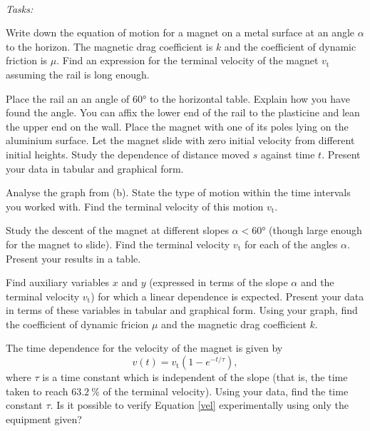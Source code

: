 \documentclass[../TST.tex]{subfiles}
\begin{document}
\begin{eproblem}{\ \\[5pt]}
\textit{Tasks:}
\begin{subpart}
\item Write down the equation of motion for a magnet on a metal surface at an angle $\alpha$ to the horizon. The magnetic drag coefficient is $k$ and the coefficient of dynamic friction is $\mu$. Find an expression for the terminal velocity of the magnet $v_\mathrm{t}$ assuming the rail is long enough.
\item Place the rail an an angle of $\ang{60}$ to the horizontal table. Explain how you have found the angle. You can affix the lower end of the rail to the plasticine and lean the upper end on the wall. Place the magnet with one of its poles lying on the aluminium surface. Let the magnet slide with zero initial velocity from different initial heights. Study the dependence of distance moved $s$ against time $t$. Present your data in tabular and graphical form.
\item Analyse the graph from (b). State the type of motion within the time intervals you worked with. Find the terminal velocity of this motion $v_\mathrm{t}$.
\item Study the descent of the magnet at different slopes $\alpha<\ang{60}$ (though large enough for the magnet to slide). Find the terminal velocity $v_\mathrm{t}$ for each of the angles $\alpha$. Present your results in a table.
\item Find auxiliary variables $x$ and $y$ (expressed in terms of the slope $\alpha$ and the terminal velocity $v_\mathrm{t}$) for which a linear dependence is expected. Present your data in terms of these variables in tabular and graphical form. Using your graph, find the coefficient of dynamic fricion $\mu$ and the magnetic drag coefficient $k$.
\item The time dependence for the velocity of the magnet is given by
	\begin{equation}
		v(t)=v_\mathrm{t}(1-e^{-t/\tau})
	,
	\label{vel}
	\end{equation}
	where $\tau$ is a time constant which is independent of the slope (that is, the time taken to reach $\qty{63.2}{\percent}$ of the terminal velocity). Using your data, find the time constant $\tau$. Is it possible to verify Equation \eqref{vel} experimentally using only the equipment given?  
\end{subpart}
\end{eproblem}
\end{document}
